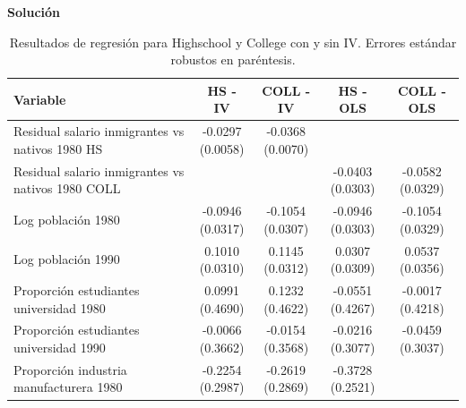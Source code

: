 \documentclass[a4paper, answers, addpoints, 11pt]{exam}
\newenvironment{solucion}{%
  \begin{mdframed}[
    backgroundcolor=blue!5,    %
    linecolor=blue!50,          %
    linewidth=2pt,              %
    leftmargin=10pt,            %
    rightmargin=8pt,           %
    topline=true,              %
    bottomline=true,            %
    roundcorner=10pt,           %
    innerleftmargin=10pt,       %
    innerrightmargin=10pt,      %
    innerbottommargin=10pt,     %
    innertopmargin=10pt         %
  ]%
  \begin{tcolorbox}[colframe=blue!50!black, colback=blue!50, coltitle=white, sharp corners=all, boxrule=1mm, width=\textwidth, halign=left, valign=center, top=0mm, bottom=0mm, left=0mm, right=0mm] \textbf{Solución} \end{tcolorbox} }{\end{mdframed}}
\begin{document}
\begin{itemize}
\begin{itemize}
\begin{solucion}
\begin{table}[H]
\centering
\small
\caption{Resultados de regresión para Highschool y College con y sin IV. Errores estándar robustos en paréntesis.}
\label{tab:resultados}
\begin{tabular}{p{5cm}cccc}
\hline
\textbf{Variable} & \textbf{HS - IV} & \textbf{COLL - IV} & \textbf{HS - OLS} & \textbf{COLL - OLS} \\
\hline
Residual salario inmigrantes vs nativos 1980 HS 
& \makecell{-0.0297 \\ (0.0058)} 
& \makecell{-0.0368 \\ (0.0070)} 
& 
& 
\\
Residual salario inmigrantes vs nativos 1980 COLL 
& 
& 
& \makecell{-0.0403 \\ (0.0303)} 
& \makecell{-0.0582 \\ (0.0329)} 
\\
Log población 1980 
& \makecell{-0.0946 \\ (0.0317)} 
& \makecell{-0.1054 \\ (0.0307)} 
& \makecell{-0.0946 \\ (0.0303)} 
& \makecell{-0.1054 \\ (0.0329)} 
\\
Log población 1990 
& \makecell{0.1010 \\ (0.0310)} 
& \makecell{0.1145 \\ (0.0312)} 
& \makecell{0.0307 \\ (0.0309)} 
& \makecell{0.0537 \\ (0.0356)} 
\\
Proporción estudiantes universidad 1980 
& \makecell{0.0991 \\ (0.4690)} 
& \makecell{0.1232 \\ (0.4622)} 
& \makecell{-0.0551 \\ (0.4267)} 
& \makecell{-0.0017 \\ (0.4218)} 
\\
Proporción estudiantes universidad 1990 
& \makecell{-0.0066 \\ (0.3662)} 
& \makecell{-0.0154 \\ (0.3568)} 
& \makecell{-0.0216 \\ (0.3077)} 
& \makecell{-0.0459 \\ (0.3037)} 
\\
Proporción industria manufacturera 1980 
& \makecell{-0.2254 \\ (0.2987)} 
& \makecell{-0.2619 \\ (0.2869)} 
& \makecell{-0.3728 \\ (0.2521)} 

\end{tabular}
\end{table}
\end{solucion}
\end{itemize}
\end{itemize}
\end{document}
